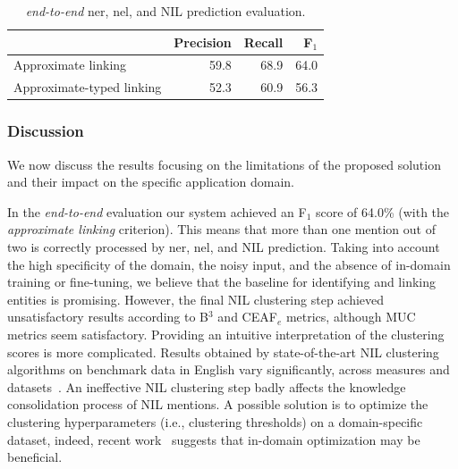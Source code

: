 \begin{table}[H]
    \centering
    \begin{tabular}{lrrr}
        \toprule
        & \textbf{Precision} & \textbf{Recall} & \textbf{F$_1$} \\
        \midrule
        Approximate linking      & 59.8 & 68.9 & 64.0 \\
        Approximate-typed linking & 52.3 & 60.9 & 56.3 \\
        \bottomrule
    \end{tabular}
    \caption{\textit{end-to-end} \ac{ner}, \ac{nel}, and NIL prediction evaluation.}
    \label{tab:nereval:withlink}
\end{table}

\subsubsection{Discussion}

We now discuss the results focusing on the limitations of the proposed solution and their impact on the specific application domain.



In the \textit{end-to-end} evaluation our system achieved an F$_{1}$ score of 64.0\% (with the \textit{approximate linking} criterion). This means that more than one mention out of two is correctly processed by \ac{ner}, \ac{nel}, and NIL prediction. Taking into account the high specificity of the domain, the noisy input, and the absence of in-domain training or fine-tuning, we believe that the baseline for identifying and linking entities is promising. However, the final NIL clustering step achieved unsatisfactory results according to B$^3$ and CEAF$_e$ metrics, although MUC metrics seem satisfactory. Providing an intuitive interpretation of the clustering scores is more complicated. Results obtained by state-of-the-art NIL clustering algorithms on benchmark data in English vary significantly, across measures and datasets~\cite{logan2021benchmarking}. An ineffective NIL clustering step badly affects the knowledge consolidation process of NIL mentions. A possible solution is to optimize the clustering hyperparameters (i.e., clustering thresholds) on a domain-specific dataset, indeed, recent work~\cite{logan2021benchmarking} suggests that in-domain optimization may be beneficial.

